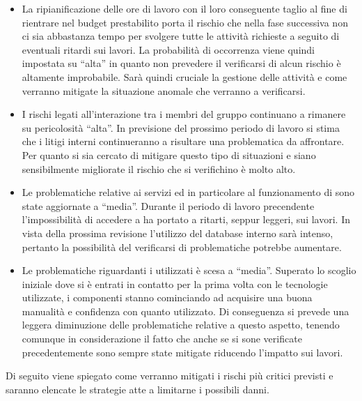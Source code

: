 \FloatBarrier
\begin{itemize}
\item La ripianificazione delle ore di lavoro con il loro conseguente taglio al fine di rientrare nel budget prestabilito porta il rischio che nella fase successiva non ci sia abbastanza tempo per svolgere tutte le attività richieste a seguito di eventuali ritardi sui lavori.
La probabilità di occorrenza viene quindi impostata su ``alta'' in quanto non prevedere il verificarsi di alcun rischio è altamente improbabile.
Sarà quindi cruciale la gestione delle attività e come verranno mitigate la situazione anomale che verranno a verificarsi.
\item I rischi legati all'interazione tra i membri del gruppo continuano a rimanere su pericolosità ``alta''.
In previsione del prossimo periodo di lavoro si stima che i litigi interni continueranno a risultare una problematica da affrontare. Per quanto si sia cercato di mitigare questo tipo di situazioni e siano sensibilmente migliorate il rischio che si verifichino è molto alto.
\item Le problematiche relative ai servizi  ed in particolare al funzionamento di \pragmadb sono state aggiornate a ``media''. Durante il periodo di lavoro precendente l'impossibilità di accedere a \pragmadb ha portato a ritarti, seppur leggeri, sui lavori. In vista della prossima revisione l'utilizzo del database interno sarà intenso, pertanto la possibilità del verificarsi di problematiche potrebbe aumentare.
\item Le problematiche riguardanti  i  utilizzati è scesa a ``media''. Superato lo scoglio iniziale dove si è entrati in contatto per la prima volta con le tecnologie utilizzate, i componenti stanno cominciando ad acquisire una buona manualità e confidenza con quanto utilizzato. Di conseguenza si prevede una leggera diminuzione delle problematiche relative a questo aspetto, tenendo comunque in considerazione il fatto che anche se si sone verificate precedentemente sono sempre state mitigate riducendo l'impatto sui lavori.
\end{itemize}
\label{mRisk6}
Di seguito viene spiegato come verranno mitigati i rischi più critici previsti e saranno elencate le strategie atte a limitarne i possibili danni.
